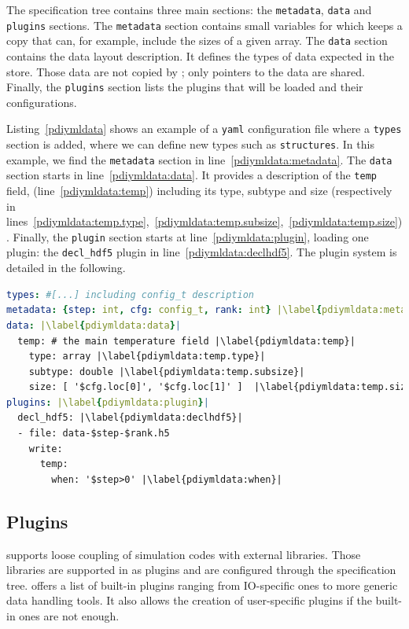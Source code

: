 The specification tree contains three main sections: the \texttt{metadata}, \texttt{data} and \texttt{plugins} sections. The \texttt{metadata} section contains small variables for which \pdi keeps a copy that can, for example, include the sizes of a given array. The \texttt{data} section contains the data layout description. It defines the types of data expected in the store. Those data are not copied by \pdi; only pointers to the data are shared. Finally, the \texttt{plugins} section lists the plugins that will be loaded and their configurations. 

Listing~\ref{pdiymldata} shows an example of a \pdi \texttt{yaml} configuration file where a \texttt{types} section is added, where we can define new types such as \texttt{structures}. In this example, we find the \texttt{metadata} section in line~\ref{pdiymldata:metadata}. The \texttt{data} section starts in line~\ref{pdiymldata:data}. It provides a description of the \texttt{temp} field, (line~\ref{pdiymldata:temp}) including its type, subtype and size (respectively in lines~\ref{pdiymldata:temp.type},~\ref{pdiymldata:temp.subsize},~\ref{pdiymldata:temp.size}). 
Finally, the \texttt{plugin} section starts at line~\ref{pdiymldata:plugin}, loading one plugin: the \texttt{decl\_hdf5} plugin in line~\ref{pdiymldata:declhdf5}. The \pdi plugin system is detailed in the following.

\begin{lstlisting}[float=h, label=pdiymldata, language=yaml, caption=Data description in \pdi YAML file]
types: #[...] including config_t description
metadata: {step: int, cfg: config_t, rank: int} |\label{pdiymldata:metadata}|
data: |\label{pdiymldata:data}|
  temp: # the main temperature field |\label{pdiymldata:temp}|
    type: array |\label{pdiymldata:temp.type}|
    subtype: double |\label{pdiymldata:temp.subsize}|
    size: [ '$cfg.loc[0]', '$cfg.loc[1]' ]  |\label{pdiymldata:temp.size}|
plugins: |\label{pdiymldata:plugin}|
  decl_hdf5: |\label{pdiymldata:declhdf5}|
  - file: data-$step-$rank.h5 
    write:
      temp:
        when: '$step>0' |\label{pdiymldata:when}|
\end{lstlisting}

\subsection{\pdi Plugins}\label{plugins}
\pdi supports loose coupling of simulation codes with external libraries. Those libraries are supported in \pdi as plugins and are configured through the specification tree. \pdi offers a list of built-in plugins ranging from IO-specific ones to more generic data handling tools. It also allows the creation of user-specific plugins if the built-in ones are not enough.     

